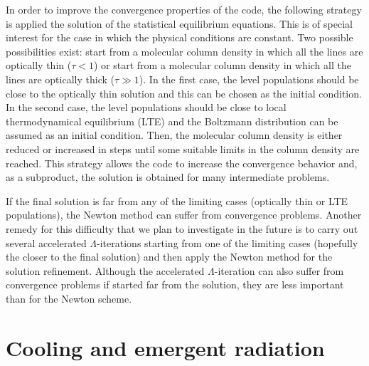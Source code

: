 \documentclass[12pt]{article}
\begin{document}
In order to improve the convergence properties of the code, the following strategy
is applied the solution of the statistical equilibrium equations. This is of special
interest for the case in which the physical conditions are constant. Two possible
possibilities exist: start from a molecular column density in which all the lines
are optically thin ($\tau < 1$) or start from a molecular column density in which
all the lines are optically thick ($\tau \gg 1$). In the first case, the level
populations should be close to the optically thin solution and this can be chosen
as the initial condition. In the second case, the level populations should be close
to local thermodynamical equilibrium (LTE) and the Boltzmann distribution can be
assumed as an initial condition. Then, the molecular column density is either reduced
or increased in steps until some suitable limits in the column density are
reached. This strategy allows the code to increase the convergence behavior and, as
a subproduct, the solution is obtained for many intermediate problems.

If the final solution is far from any of the limiting cases (optically thin or
LTE populations), the Newton method can suffer from convergence problems. Another
remedy for this difficulty that we plan to investigate in the future is to carry out
several accelerated $\Lambda$-iterations starting from one of the limiting cases
(hopefully the closer to the final solution) and then apply the Newton method
for the solution refinement. Although the accelerated $\Lambda$-iteration can also
suffer from convergence problems if started far from the solution, they are less
important than for the Newton scheme.


\section{Cooling and emergent radiation}
\end{document}
